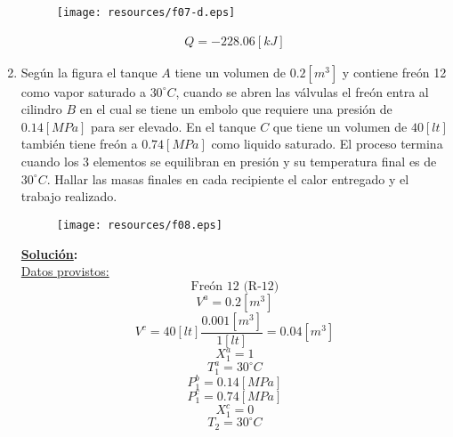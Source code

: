 \documentclass[letter,11pt]{article}
\begin{document}
\begin{enumerate}
\begin{figure}[H]
\centering
\texttt{[image: resources/f07-d.eps]}
\end{figure}

\begin{equation*}
\boxed{
    \begin{array}{l}
        Q = -228.06[kJ]
    \end{array}
}
\end{equation*}
\newpage

\item Según la figura el tanque $A$ tiene un volumen de $0.2[m^3]$ y contiene
freón 12 como vapor saturado a $30^\circ C$, cuando se abren las válvulas el
freón entra al cilindro $B$ en el cual se tiene un embolo que requiere una
presión de $0.14[MPa]$ para ser elevado. En el tanque $C$ que tiene un volumen
de $40[lt]$ también tiene freón a $0.74[MPa]$ como liquido saturado. El proceso
termina cuando los 3 elementos se equilibran en presión y su temperatura final
es de $30^\circ C$. Hallar las masas finales en cada recipiente el calor
entregado y el trabajo realizado.

\begin{figure}[H]
\centering
\texttt{[image: resources/f08.eps]}
\end{figure}

\textbf{\underline{Solución}:} \\

\underline{Datos provistos:}
\begin{equation*}
    \text{Freón 12 (R-12)}
\end{equation*}
\begin{equation*}
    V^a = 0.2[m^3]
\end{equation*}
\begin{equation*}
    V^c = 40[lt]\frac{0.001[m^3]}{1[lt]}=0.04[m^3]
\end{equation*}
\begin{equation*}
    X_1^a = 1
\end{equation*}
\begin{equation*}
    T_1^a = 30^\circ C
\end{equation*}
\begin{equation*}
    P_1^b = 0.14[MPa]
\end{equation*}
\begin{equation*}
    P_1^c = 0.74[MPa]
\end{equation*}
\begin{equation*}
    X_1^c = 0
\end{equation*}
\begin{equation*}
    T_2 = 30^\circ C
\end{equation*}


\end{enumerate}
\end{document}
